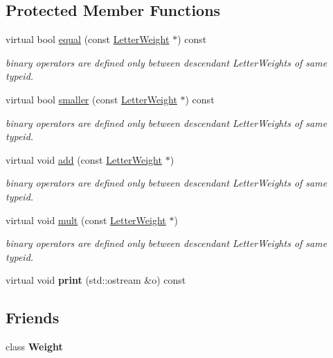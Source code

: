 \subsection*{Protected Member Functions}
\begin{DoxyCompactItemize}
\item 
virtual bool \mbox{\hyperlink{group__weight_gaf00322921db3c5212f8d5ca63081d689}{equal}} (const \mbox{\hyperlink{classLetterWeight}{Letter\+Weight}} $\ast$) const
\begin{DoxyCompactList}\small\item\em binary operators are defined only between descendant Letter\+Weights of same typeid. \end{DoxyCompactList}\item 
virtual bool \mbox{\hyperlink{group__weight_ga0ef9dd9bcd765c0e3c50b384b34d88d2}{smaller}} (const \mbox{\hyperlink{classLetterWeight}{Letter\+Weight}} $\ast$) const
\begin{DoxyCompactList}\small\item\em binary operators are defined only between descendant Letter\+Weights of same typeid. \end{DoxyCompactList}\item 
virtual void \mbox{\hyperlink{group__weight_ga49b09c8f364a2ebf1d154f606d9aaea8}{add}} (const \mbox{\hyperlink{classLetterWeight}{Letter\+Weight}} $\ast$)
\begin{DoxyCompactList}\small\item\em binary operators are defined only between descendant Letter\+Weights of same typeid. \end{DoxyCompactList}\item 
virtual void \mbox{\hyperlink{group__weight_gad1208e74e54ca8fc2f361e6fc106df01}{mult}} (const \mbox{\hyperlink{classLetterWeight}{Letter\+Weight}} $\ast$)
\begin{DoxyCompactList}\small\item\em binary operators are defined only between descendant Letter\+Weights of same typeid. \end{DoxyCompactList}\item 
virtual void {\bfseries print} (std\+::ostream \&o) const
\end{DoxyCompactItemize}
\subsection*{Friends}
\begin{DoxyCompactItemize}
\item 
\mbox{\label{classLetterWeight_aa953d5bac280cba9bdb18a96c373d81b}} 
class {\bfseries Weight}
\end{DoxyCompactItemize}


